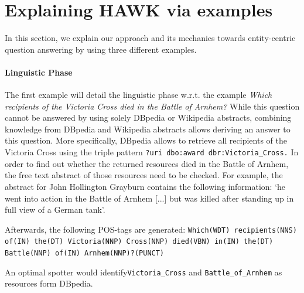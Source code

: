 \section{Explaining HAWK via examples}
\label{sec:hawkexample}
In this section, we explain our approach and its mechanics towards entity-centric question answering by using three different  examples. 

\paragraph{Linguistic Phase} The first example will detail the linguistic phase w.r.t. the  example \emph{Which recipients of the Victoria Cross died in the Battle of Arnhem?}
While this question cannot be answered by using solely DBpedia or Wikipedia abstracts, combining knowledge from DBpedia and Wikipedia abstracts allows deriving an answer to this question.
 More specifically, DBpedia allows to retrieve all recipients of the Victoria Cross using the triple pattern \texttt{?uri dbo:award dbr:Victoria\_Cross.}
In order to find out whether the returned resources died in the Battle of Arnhem, the free text abstract of those resources need to be checked. 
For example, the abstract for John Hollington Grayburn contains the following information: 
`he went into action in the Battle of Arnhem [...] but was killed after standing up in full view of a German tank'. 

Afterwards, the following POS-tags are generated:
\texttt{Which(WDT) recipients(NNS) of(IN) the(DT) Victoria(NNP) Cross(NNP) died(VBN) in(IN) the(DT) \\Battle(NNP) of(IN) Arnhem(NNP)?(PUNCT)}

An optimal spotter would identify\texttt{Victoria\_Cross} and \texttt{Battle\_of\_Arnhem} as resources form DBpedia.


